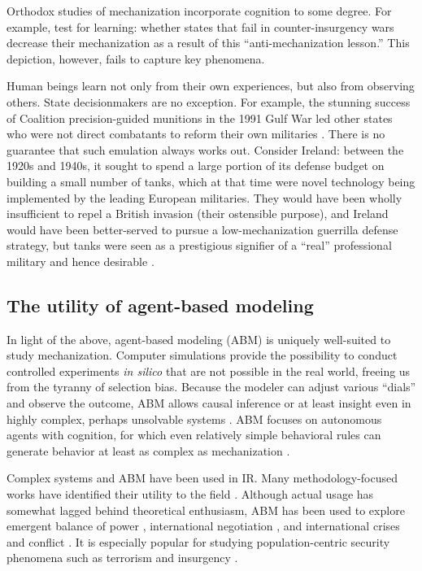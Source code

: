 \documentclass{article}
\begin{document}
Orthodox studies of mechanization incorporate cognition to some degree. For example,
\citet{sechser2010army} test for learning: whether states that fail in
counter-insurgency wars decrease their mechanization as a result of this
``anti-mechanization lesson.'' This depiction, however, fails to capture 
key phenomena. 

Human beings learn not only from their own experiences, but also from observing others.
State decisionmakers are no exception. For example, the stunning success of
Coalition precision-guided munitions in the 1991 Gulf War led other states who
were not direct combatants to reform their own militaries
\citep{scobell2011chinese}. There is no guarantee that such emulation always
works out. Consider Ireland: between the 1920s and 1940s, it sought to spend a
large portion of its defense budget on building a small number of
tanks, which at that time were novel technology being implemented by the leading
European militaries. They would have been wholly insufficient to repel a British invasion (their ostensible purpose), 
and Ireland would have been better-served to pursue a low-mechanization guerrilla defense strategy, 
but tanks were seen as a prestigious signifier of a ``real'' professional
military and hence desirable
\citep{farrell1998professionalization,farrell2001transnational}.

\subsection{The utility of agent-based modeling}

In light of the above, agent-based modeling (ABM) is 
uniquely well-suited to study mechanization. Computer simulations provide the possibility 
to conduct controlled experiments \textit{in silico} \citep{epstein1996growing} that are not possible 
in the real world, freeing us from the tyranny of selection bias. Because the
modeler can adjust various ``dials'' and observe the outcome, ABM allows causal
inference or at least insight even in highly complex, perhaps unsolvable systems
\citep[c.f.][]{axtell2000agents}. ABM focuses on autonomous agents with
cognition, for which even relatively simple behavioral rules can generate
behavior at least as complex as mechanization
\citep{gilbert2005simulation}.

Complex systems and ABM have been used in IR. Many methodology-focused
works have identified their utility to the field \citep[some prominent examples
are][]{modelski1990world,jervis1998system,pepinsky2005agents,de2014agent}.
Although actual usage has somewhat lagged behind theoretical enthusiasm,
ABM has been used to explore emergent 
balance of power \citep{cederman1997emergent}, international negotiation
\citep{earnest2008coordination}, and international crises and conflict
\citep{masad2016dissertation}. It is especially popular for studying
population-centric security phenomena such as terrorism and insurgency
\citep{cioffi2010mason,bhavnani2012modeling,weidmann2013violence,bhavnani2014group}.
\end{document}
